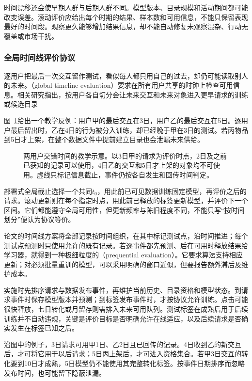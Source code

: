 时间漂移还会使早期人群与后期人群不同。模型版本、目录规模和活动期间都可能改变误差。滚动评价应给出每个时期的结果、样本数和可用信息，不能只保留表现最好的时间段。观察更久能够增加结果信息，却不能自动修复未观察混杂、行动无覆盖或市场干扰。

\Needspace{95mm}
\subsubsection{全局时间线评价协议}
\label{sec:rs-evaluation-timeline}

逐用户把最后一次交互留作测试，看似每人都只用自己的过去，却仍可能读取别人的未来。（global timeline evaluation）要求在所有用户共享的时钟上检查可用信息。相关研究指出，按用户各自切分会让未来交互和未来对象进入更早请求的训练或候选目录

图~\ref{fig:rs-evaluation-timeline}给出一个教学反例：用户甲的最后交互在3日，用户乙的最后交互在5日。逐用户最后留出时，乙在4日的行为被分入训练，却已经晚于甲在3日的测试。若丙物品到5日才上架，在整个数据文件中提前建立目录也会泄漏未来供给。

\begin{figure}[htbp]
  \centering
  
  \caption{两用户交错时间的教学示意。以3日甲的请求为评价时点，2日及之前已获知的记录可以使用，4日乙的交互和5日才上架的对象均不可使用。虚线只标记信息截止，事件仍按各自发生和回传时间判定。}
  \label{fig:rs-evaluation-timeline}
\end{figure}

部署式全局截止选择一个共同$t_0$，用此前已可见数据训练固定模型，再评价之后的请求。滚动更新则在每个指定时点，用此前已释放的标签更新模型，并评价下一个区间。它们都能遵守全局可用性，但更新频率与陈旧程度不同，不能只写“按时间划分”便认为协议等价。

论文的时间线方案将全部记录按时间组织，在其中标记测试点，沿时间推进；每个测试点预测时只使用允许的既有记录。若逐事件都先预测、后在可用时释放结果给学习器，就得到一种极细粒度的（prequential evaluation）。它要求算法支持相应更新；对必须批量重训的模型，可以采用明确的窗口近似，但要报告额外滞后及维护成本。

实施时先排序请求与数据发布事件，再维护当前历史、目录资格和模型状态。到请求事件时保存模型版本并预测；到标签发布事件时，才按协议允许训练。点击可能很快释放，七日转化或月留存则需排入未来可用队列。测试标签在成熟后用于后续训练并不自动违规，关键是评价目标是否明确允许在线适应，以及后续请求是否确实发生在标签已知之后。

沿图中的例子，3日请求可用甲1日、乙2日且已回传的记录。4日收到乙的新交互后，才可将它用于以后请求；5日丙上架后，才可进入资格集合。若甲3日交互的转化要到10日才成熟，5日模型仍不能使用其完整转化标签。按事件日期排序而忽略发布时间，也可能留下隐蔽泄漏。

